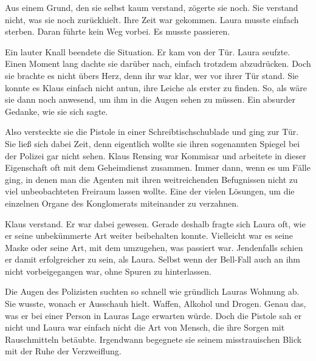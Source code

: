 \par

Aus einem Grund, den sie selbst kaum verstand, zögerte sie noch.
Sie verstand nicht, was sie noch zurückhielt.
Ihre Zeit war gekommen.
Laura musste einfach sterben.
Daran führte kein Weg vorbei.
Es musste passieren.

\par

Ein lauter Knall beendete die Situation.
Er kam von der Tür.
Laura seufzte.
Einen Moment lang dachte sie darüber nach, einfach trotzdem abzudrücken.
Doch sie brachte es nicht übers Herz, denn ihr war klar, wer vor ihrer Tür stand.
Sie konnte es Klaus einfach nicht antun, ihre Leiche als erster zu finden.
So, als wäre sie dann noch anwesend, um ihm in die Augen sehen zu müssen.
Ein absurder Gedanke, wie sie sich sagte.

\par

Also versteckte sie die Pistole in einer Schreibtischschublade und ging zur Tür.
Sie ließ sich dabei Zeit, denn eigentlich wollte sie ihren sogenannten Spiegel bei der Polizei gar nicht sehen.
Klaus Rensing war Kommisar und arbeitete in dieser Eigenschaft oft mit dem Geheimdienst zusammen.
Immer dann, wenn es um Fälle ging, in denen man die Agenten mit ihren weitreichenden Befugnissen nicht zu viel unbeobachteten Freiraum lassen wollte.
Eine der vielen Lösungen, um die einzelnen Organe des Konglomerats miteinander zu verzahnen.

\par

Klaus verstand.
Er war dabei gewesen.
Gerade deshalb fragte sich Laura oft, wie er seine unbekümmerte Art weiter beibehalten konnte.
Vielleicht war es seine Maske oder seine Art, mit dem umzugehen, was passiert war.
Jendenfalls schien er damit erfolgreicher zu sein, als Laura.
Selbst wenn der Bell-Fall auch an ihm nicht vorbeigegangen war, ohne Spuren zu hinterlassen.

\par

Die Augen des Polizisten suchten so schnell wie gründlich Lauras Wohnung ab.
Sie wusste, wonach er Ausschauh hielt.
Waffen, Alkohol und Drogen.
Genau das, was er bei einer Person in Lauras Lage erwarten würde.
Doch die Pistole sah er nicht und Laura war einfach nicht die Art von Mensch, die ihre Sorgen mit Rauschmitteln betäubte.
Irgendwann begegnete sie seinem misstrauischen Blick mit der Ruhe der Verzweiflung.

\par

